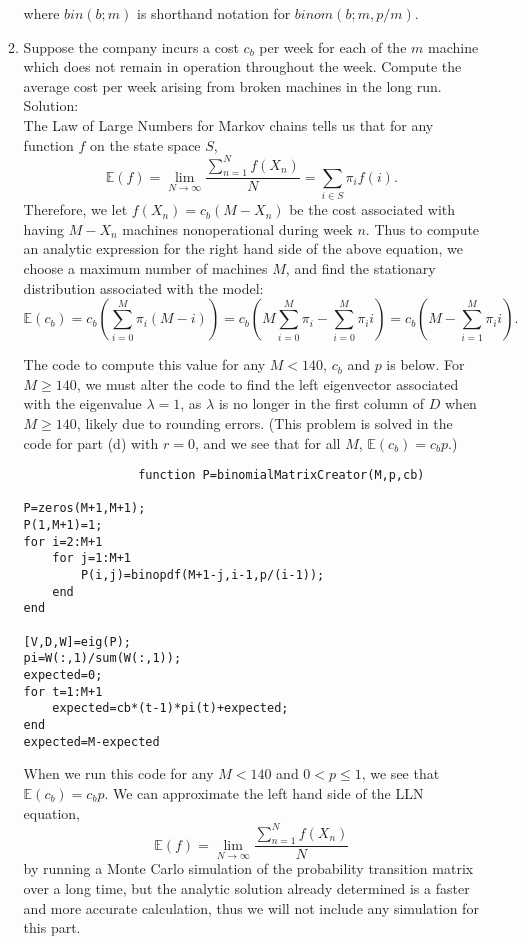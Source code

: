 \documentclass[12pt]{article}
\numberwithin{equation}{section}
\begin{document}
\begin{enumerate}
\begin{enumerate}
            where $bin(b;m)$ is shorthand notation for $binom(b;m,p/m)$.

            \item Suppose the company incurs a cost $c_b$ per week for each of the $m$ machine which does not remain in operation throughout the week. Compute the average cost per week arising from broken machines in the long run.\\

                Solution:\\

                The Law of Large Numbers for Markov chains tells us that for any function $f$ on the state space $S$,
                $$\mathbb{E}(f)=\lim_{N\to\infty}\frac{\sum_{n=1}^Nf(X_n)}{N}=\sum_{i\in S}\pi_if(i).$$
                Therefore, we let $f(X_n)=c_b(M-X_n)$ be the cost associated with having $M-X_n$ machines nonoperational during week $n$. Thus to compute an analytic expression for the right hand side of the above equation, we choose a maximum number of machines $M$, and find the stationary distribution associated with the model:
                $$\mathbb{E}(c_b)= c_b(\sum_{i=0}^{M}\pi_i(M-i))=c_b(M\sum_{i=0}^M\pi_i-\sum_{i=0}^M\pi_ii)=c_b(M-\sum_{i=1}^M\pi_ii).$$

                The code to compute this value for any $M<140$, $c_b$ and $p$ is below. For $M\geq 140$, we must alter the code to find the left eigenvector associated with the eigenvalue $\lambda=1$, as $\lambda$ is no longer in the first column of $D$ when $M\geq 140$, likely due to rounding errors. (This problem is solved in the code for part (d) with $r=0$, and we see that for all $M$, $\mathbb{E}(c_b)=c_bp$.)
                \begin{lstlisting}
                function P=binomialMatrixCreator(M,p,cb)

P=zeros(M+1,M+1);
P(1,M+1)=1;
for i=2:M+1
    for j=1:M+1
        P(i,j)=binopdf(M+1-j,i-1,p/(i-1));
    end
end

[V,D,W]=eig(P);
pi=W(:,1)/sum(W(:,1));
expected=0;
for t=1:M+1
    expected=cb*(t-1)*pi(t)+expected;
end
expected=M-expected
\end{lstlisting}

                When we run this code for any $M<140$ and $0< p\leq 1$, we see that $\mathbb{E}(c_b)=c_bp.$ We can approximate the left hand side of the LLN equation,
        $$\mathbb{E}(f)=\lim_{N\to\infty}\frac{\sum_{n=1}^Nf(X_n)}{N}$$
        by running a Monte Carlo simulation of the probability transition matrix over a long time, but the analytic solution already determined is a faster and more accurate calculation, thus we will not include any simulation for this part.


\end{enumerate}
\end{enumerate}
\end{document}
